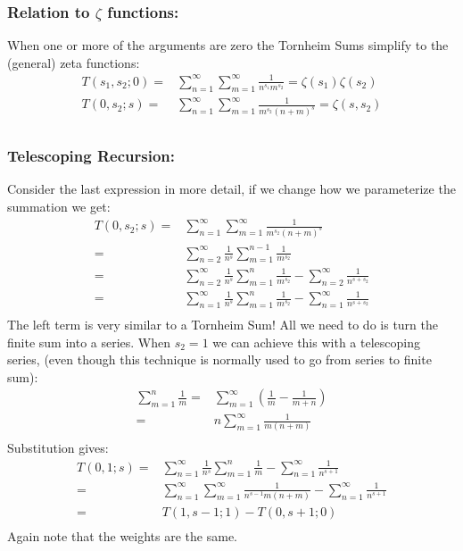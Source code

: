 \subsubsection{Relation to $\zeta$ functions:}
When one or more of the arguments are zero the Tornheim Sums simplify to the (general) zeta functions:
\begin{equation*}
\begin{aligned}
	T(s_1,s_2;0) =& \sum_{n=1}^\infty\sum_{m=1}^\infty\frac{1}{n^{s_1}m^{s_2}} =\zeta(s_1)\zeta(s_2)\\
	T(0,s_2;s) =& \sum_{n=1}^\infty\sum_{m=1}^\infty\frac{1}{m^{s_2}(n+m)^s} =\zeta(s,s_2)\\
\end{aligned}
\end{equation*}

\subsubsection{Telescoping Recursion:}
Consider the last expression in more detail,
if we change how we parameterize the summation we get:
\begin{equation*}
\begin{aligned}
	T(0,s_2;s)=& \sum_{n=1}^\infty\sum_{m=1}^\infty\frac{1}{m^{s_2}(n+m)^s}\\
	=&\sum_{n=2}^\infty\frac{1}{n^s}\sum_{m=1}^{n-1}\frac{1}{m^{s_2}} \\
	=&\sum_{n=2}^\infty\frac{1}{n^s}\sum_{m=1}^n\frac{1}{m^{s_2}}-\sum_{n=2}^\infty\frac{1}{n^{s+s_2}} \\
	=&\sum_{n=1}^\infty\frac{1}{n^s}\sum_{m=1}^n\frac{1}{m^{s_2}}-\sum_{n=1}^\infty\frac{1}{n^{s+s_2}} \\
\end{aligned}
\end{equation*}
The left term is very similar to a Tornheim Sum!
All we need to do is turn the finite sum into a series.
When $s_2=1$ we can achieve this with a telescoping series,
(even though this technique is normally used to go from series to finite sum):
\begin{equation*}
\begin{aligned}
	\sum_{m=1}^{n}\frac{1}{m} =&\sum_{m=1}^\infty\left(\frac{1}{m}-\frac{1}{m+n}\right)\\
	=&n\sum_{m=1}^\infty\frac{1}{m(n+m)}\\
\end{aligned}
\end{equation*}
Substitution gives:
\begin{equation*}
\begin{aligned}
	T(0,1;s) =&\sum_{n=1}^\infty\frac{1}{n^s}\sum_{m=1}^n\frac{1}{m}-\sum_{n=1}^\infty\frac{1}{n^{s+1}} \\
	=&\sum_{n=1}^\infty\sum_{m=1}^\infty\frac{1}{n^{s-1}m(n+m)}-\sum_{n=1}^\infty\frac{1}{n^{s+1}} \\
	=&T(1,s-1;1)-T(0,s+1;0)\\
\end{aligned}
\end{equation*}
Again note that the weights are the same.

